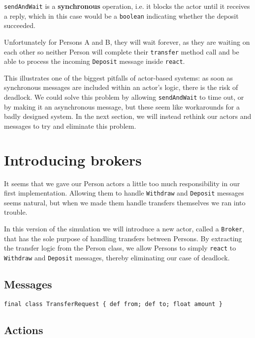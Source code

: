 \documentclass[a4paper,12pt]{kth-mag}
\begin{document}
\texttt{sendAndWait} is a \textbf{synchronous} operation, i.e. it blocks the actor until it receives a reply, which in this case would be a \texttt{boolean} indicating whether the deposit succeeded.

Unfortunately for Persons A and B, they will wait forever, as they are waiting on each other so neither Person will complete their \texttt{transfer} method call and be able to process the incoming \texttt{Deposit} message inside \texttt{react}.

This illustrates one of the biggest pitfalls of actor-based systems: as soon as synchronous messages are included within an actor's logic, there is the risk of deadlock. We could solve this problem by allowing \texttt{sendAndWait} to time out, or by making it an asynchronous message, but these seem like workarounds for a badly designed system. In the next section, we will instead rethink our actors and messages to try and eliminate this problem.

\section{Introducing brokers}

It seems that we gave our Person actors a little too much responsibility in our first implementation. Allowing them to handle \texttt{Withdraw} and \texttt{Deposit} messages seems natural, but when we made them handle transfers themselves we ran into trouble.

In this version of the simulation we will introduce a new actor, called a \texttt{Broker}, that has the sole purpose of handling transfers between Persons. By extracting the transfer logic from the Person class, we allow Persons to simply \texttt{react} to \texttt{Withdraw} and \texttt{Deposit} messages, thereby eliminating our case of deadlock. 

\subsection{Messages}

\begin{listing}[H]
	\begin{verbatim}
final class TransferRequest { def from; def to; float amount }
	\end{verbatim}
\end{listing}

\subsection{Actions}
\end{document}
